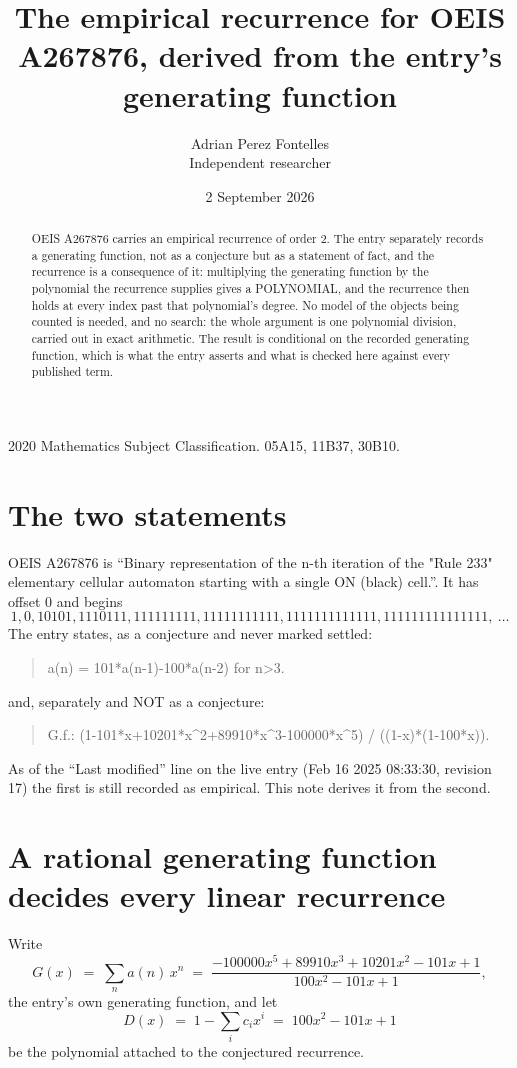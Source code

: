 \documentclass[11pt,a4paper]{article}
\title{The empirical recurrence for OEIS A267876, derived from the entry's generating function}
\author{Adrian Perez Fontelles\\ \small Independent researcher}
\date{2 September 2026}
\theoremstyle{plain}
\theoremstyle{definition}
\begin{document}
\maketitle

\begin{abstract}
OEIS A267876 carries an empirical recurrence of order $2$. The entry separately records a
generating function, not as a conjecture but as a statement of fact, and the recurrence is a
consequence of it: multiplying the generating function by the polynomial the recurrence
supplies gives a POLYNOMIAL, and the recurrence then holds at every index past that
polynomial's degree. No model of the objects being counted is needed, and no search: the
whole argument is one polynomial division, carried out in exact arithmetic. The result is
conditional on the recorded generating function, which is what the entry asserts and what is
checked here against every published term.
\end{abstract}

\noindent\small 2020 Mathematics Subject Classification. 05A15, 11B37, 30B10.\normalsize

\section{The two statements}

OEIS A267876 is ``Binary representation of the n-th iteration of the "Rule 233" elementary cellular automaton starting with a single ON (black) cell.''. It has offset $0$ and begins
\[
1, 0, 10101, 1110111, 111111111, 11111111111, 1111111111111, 111111111111111,\ \dots
\]
The entry states, as a conjecture and never marked settled:
\begin{quote}
a(n) = 101*a(n-1)-100*a(n-2) for n>3.
\end{quote}
and, separately and NOT as a conjecture:
\begin{quote}
G.f.: (1-101*x+10201*x\^{}2+89910*x\^{}3-100000*x\^{}5) / ((1-x)*(1-100*x)).
\end{quote}
As of the ``Last modified'' line on the live entry (Feb 16 2025 08:33:30, revision 17) the first is still
recorded as empirical. This note derives it from the second.

\section{A rational generating function decides every linear recurrence}

Write
\[
G(x)\;=\;\sum_{n}a(n)\,x^{n}\;=\;\frac{- 100000 x^{5} + 89910 x^{3} + 10201 x^{2} - 101 x + 1}{100 x^{2} - 101 x + 1},
\]
the entry's own generating function, and let
\[
D(x)\;=\;1-\sum_i c_i x^{i}\;=\;100 x^{2} - 101 x + 1
\]
be the polynomial attached to the conjectured recurrence.
\end{document}
